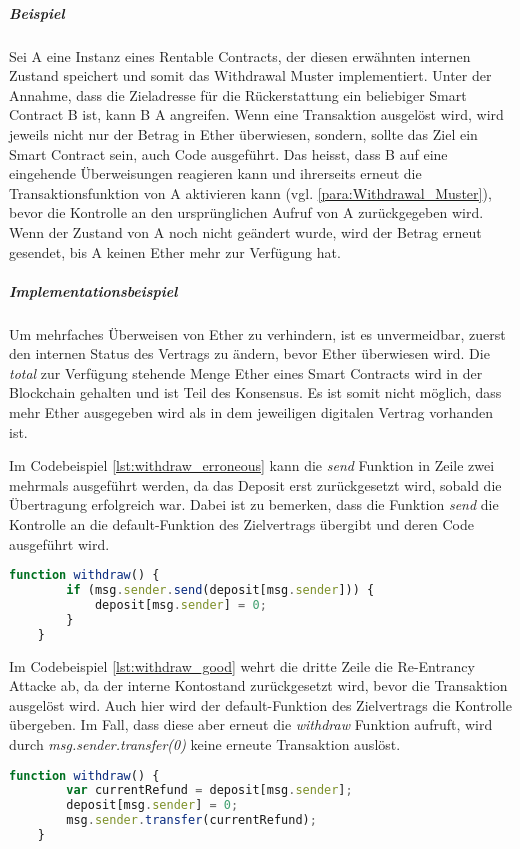 \subparagraph{Beispiel}
Sei A eine Instanz eines Rentable Contracts, der diesen erwähnten internen Zustand speichert und somit das Withdrawal Muster implementiert. Unter der Annahme, dass die Zieladresse für die Rückerstattung ein beliebiger Smart Contract B ist, kann B A angreifen. Wenn eine Transaktion ausgelöst wird, wird jeweils nicht nur der Betrag in Ether überwiesen, sondern, sollte das Ziel ein Smart Contract sein, auch Code ausgeführt. Das heisst, dass B auf eine eingehende Überweisungen reagieren kann und ihrerseits erneut die Transaktionsfunktion von A aktivieren kann (vgl. \ref{para:Withdrawal_Muster}), bevor die Kontrolle an den ursprünglichen Aufruf von A zurückgegeben wird. Wenn der Zustand von A noch nicht geändert wurde, wird der Betrag erneut gesendet, bis A keinen Ether mehr zur Verfügung hat.

\subparagraph{Implementationsbeispiel}
Um mehrfaches Überweisen von Ether zu verhindern, ist es unvermeidbar, zuerst den internen Status des Vertrags zu ändern, bevor Ether überwiesen wird. Die \emph{total} zur Verfügung stehende Menge Ether eines Smart Contracts wird in der Blockchain gehalten und ist Teil des Konsensus. Es ist somit nicht möglich, dass mehr Ether ausgegeben wird als in dem jeweiligen digitalen Vertrag vorhanden ist. 

Im Codebeispiel \ref{lst:withdraw_erroneous} kann die \emph{send} Funktion in Zeile zwei mehrmals ausgeführt werden, da das Deposit erst zurückgesetzt wird, sobald die Übertragung erfolgreich war. Dabei ist zu bemerken, dass die Funktion \emph{send} die Kontrolle an die default-Funktion des Zielvertrags übergibt und deren Code ausgeführt wird.\cite[FAQ/What's up with...]{solidity.readthedocs.io}
\begin{lstlisting}[language=javascript,caption={fehlerhaftes Code Snippet \protected{\cite[Common Patterns/Withdrawal From Contrats]{solidity.readthedocs.io}}},label={lst:withdraw_erroneous}]
    function withdraw() {
        if (msg.sender.send(deposit[msg.sender])) {
            deposit[msg.sender] = 0;
        }
    }
\end{lstlisting}

Im Codebeispiel \ref{lst:withdraw_good} wehrt die dritte Zeile die Re-Entrancy Attacke ab, da der interne Kontostand zurückgesetzt wird, bevor die Transaktion ausgelöst wird. Auch hier wird der default-Funktion des Zielvertrags die Kontrolle übergeben. Im Fall, dass diese aber erneut die \emph{withdraw} Funktion aufruft, wird durch \emph{msg.sender.transfer(0)} keine erneute Transaktion auslöst.
\begin{lstlisting}[language=javascript,caption={empfohlenes Code Snippet \protected{\cite[Common Patterns/Withdrawal From Contrats]{solidity.readthedocs.io}}},label={lst:withdraw_good}]
    function withdraw() {
        var currentRefund = deposit[msg.sender];
        deposit[msg.sender] = 0;
        msg.sender.transfer(currentRefund);
    }
\end{lstlisting}


